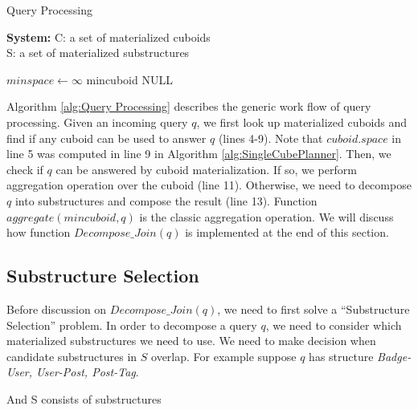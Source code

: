 \begin{algorithm}[H]
\label{alg:Query Processing}
\caption{Query Processing}
\LinesNumbered
\textbf{System:} C: a set of materialized cuboids\\ S: a set of materialized substructures\\

$minspace\leftarrow \infty $\;
mincuboid \leftarrow NULL\;
\end{algorithm}

Algorithm \ref{alg:Query Processing} describes the generic work flow of query processing. Given an incoming query $q$,
we first look up materialized cuboids and find if any cuboid can be used to answer $q$ (lines 4-9). Note that $cuboid.space$ in line 5 was computed in line 9 in Algorithm \ref{alg:SingleCubePlanner}. Then, we check if $q$ can be answered by cuboid materialization. If so, we perform aggregation operation over the cuboid (line 11). Otherwise, we need to decompose $q$ into substructures and compose the result (line 13). Function $aggregate(mincuboid, q)$ is the classic aggregation operation. We will discuss how function $Decompose\_Join(q)$ is implemented at the end of this section.

\subsection{Substructure Selection}
\label{Substructure Selection}

Before discussion on $Decompose\_Join(q)$, we need to first solve a ``Substructure Selection'' problem. In order to decompose a query $q$, we need to consider which materialized substructures we need to use. We need to make decision when candidate substructures in $S$ overlap. For example suppose $q$ has structure \textit{Badge-User, User-Post, Post-Tag}.

And S consists of substructures

